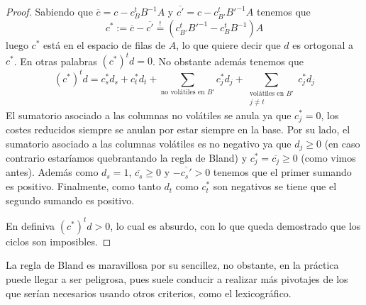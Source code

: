 \begin{proof}
	Sabiendo que $\overline{c}=c-c_B^tB^{-1}A$ y $\overline{c'}=c-c_{B'}^tB'^{-1}A$ tenemos que 
	\begin{equation*}
		c^*:=\overline{c}-\overline{c'}\stackrel{!}{=}(c_{B'}^tB'^{-1}-c_B^tB^{-1})A
	\end{equation*}
	luego $c^*$ está en el espacio de filas de $A$, lo que quiere decir que $d$ es ortogonal a $c^*$. En otras palabras $(c^*)^td=0$. No obstante además tenemos que
	\begin{equation*}
		(c^*)^td=c^*_sd_s+c^*_td_t+\sum_{\text{no volátiles en }B'}c^*_jd_j+\sum_{\substack{\text{volátiles en }B'\\j\not=t}}c^*_jd_j
	\end{equation*}
	El sumatorio asociado a las columnas no volátiles se anula ya que $c_j^*=0$, los costes reducidos siempre se anulan por estar siempre en la base. Por su lado, el sumatorio asociado a las columnas volátiles es no negativo ya que $d_j\geq 0$ (en caso contrario estaríamos quebrantando la regla de Bland) y $c_j^*=\overline{c_j}\geq 0$ (como vimos antes). Además como $d_s=1$, $\overline{c_s}\geq 0$ y $-\overline{c_s'}>0$ tenemos que el primer sumando es positivo. Finalmente, como tanto $d_t$ como $c_t^*$ son negativos se tiene que el segundo sumando es positivo.
	
	En definiva $(c^*)^td>0$, lo cual es absurdo, con lo que queda demostrado que los ciclos son imposibles.
\end{proof}
\begin{obs}[Desventajas]
	La regla de Bland es maravillosa por su sencillez, no obstante, en la práctica puede llegar a ser peligrosa, pues suele conducir a realizar más pivotajes de los que serían necesarios usando otros criterios, como el lexicográfico.
\end{obs}